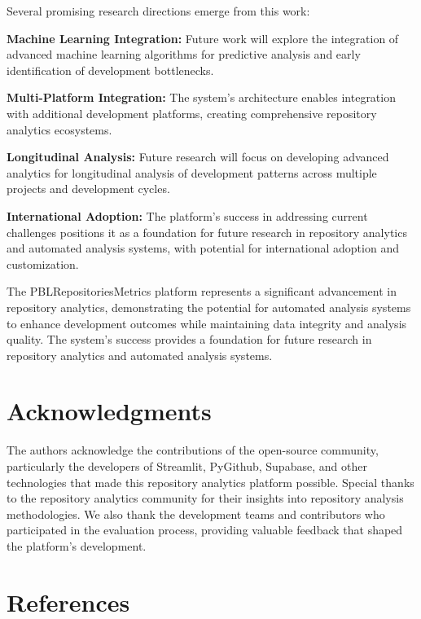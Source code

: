 \documentclass[12pt,a4paper]{article}
\begin{document}
Several promising research directions emerge from this work:

\textbf{Machine Learning Integration:} Future work will explore the integration of advanced machine learning algorithms for predictive analysis and early identification of development bottlenecks.

\textbf{Multi-Platform Integration:} The system's architecture enables integration with additional development platforms, creating comprehensive repository analytics ecosystems.

\textbf{Longitudinal Analysis:} Future research will focus on developing advanced analytics for longitudinal analysis of development patterns across multiple projects and development cycles.

\textbf{International Adoption:} The platform's success in addressing current challenges positions it as a foundation for future research in repository analytics and automated analysis systems, with potential for international adoption and customization.

The PBLRepositoriesMetrics platform represents a significant advancement in repository analytics, demonstrating the potential for automated analysis systems to enhance development outcomes while maintaining data integrity and analysis quality. The system's success provides a foundation for future research in repository analytics and automated analysis systems.

\section{Acknowledgments}

The authors acknowledge the contributions of the open-source community, particularly the developers of Streamlit, PyGithub, Supabase, and other technologies that made this repository analytics platform possible. Special thanks to the repository analytics community for their insights into repository analysis methodologies. We also thank the development teams and contributors who participated in the evaluation process, providing valuable feedback that shaped the platform's development.

\section{References}
\end{document}
